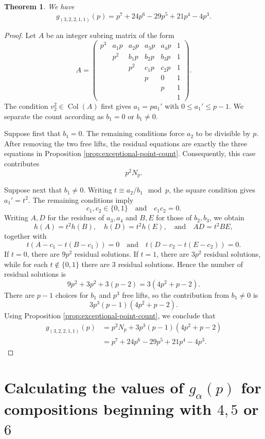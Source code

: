 \documentclass[a4paper]{amsart}
\newtheorem{theorem}{Theorem}[section]
\numberwithin{equation}{section}
\theoremstyle{remark}
\newcommand{\op}[1]{\operatorname{#1}}
\begin{document}
\begin{theorem}\label{thm:exceptional-composition}
We have
\[g_{(3,2,2,1,1)}(p)=p^7+24p^6-29p^5+21p^4-4p^3.\]
\end{theorem}
\begin{proof}
Let $A$ be an integer subring matrix of the form
\[A=\begin{pmatrix}
p^3&a_1p&a_2p&a_3p&a_4p&1\\
&p^2&b_1p&b_2p&b_3p&1\\
&&p^2&c_1p&c_2p&1\\
&&&p&0&1\\
&&&&p&1\\
&&&&&1
\end{pmatrix}.\]
The condition $v_2^2\in\op{Col}(A)$ first gives $a_1=pa_1'$ with $0\leq a_1'\leq p-1$. We separate the count according as $b_1=0$ or $b_1\neq0$.

Suppose first that $b_1=0$. The remaining conditions force $a_2$ to be divisible by $p$. After removing the two free lifts, the residual equations are exactly the three equations in Proposition \ref{prop:exceptional-point-count}. Consequently, this case contributes
\[p^2N_p.\]

Suppose next that $b_1\neq0$. Writing $t\equiv a_2/b_1\mod p$, the square condition gives $a_1'=t^2$. The remaining conditions imply
\[c_1,c_2\in\{0,1\}\quad\text{and}\quad c_1c_2=0.\]
Writing $A,D$ for the residues of $a_3,a_4$ and $B,E$ for those of $b_2,b_3$, we obtain
\[h(A)=t^2h(B),\quad h(D)=t^2h(E),\quad\text{and}\quad AD=t^2BE,\]
together with
\[t(A-c_1-t(B-c_1))=0\quad\text{and}\quad t(D-c_2-t(E-c_2))=0.\]
If $t=0$, there are $9p^2$ residual solutions. If $t=1$, there are $3p^2$ residual solutions, while for each $t\notin\{0,1\}$ there are $3$ residual solutions. Hence the number of residual solutions is
\[9p^2+3p^2+3(p-2)=3(4p^2+p-2).\]
There are $p-1$ choices for $b_1$ and $p^3$ free lifts, so the contribution from $b_1\neq0$ is
\[3p^3(p-1)(4p^2+p-2).\]
Using Proposition \ref{prop:exceptional-point-count}, we conclude that
\begin{align*}
g_{(3,2,2,1,1)}(p)
&=p^2N_p+3p^3(p-1)(4p^2+p-2)\\
&=p^7+24p^6-29p^5+21p^4-4p^3.
\end{align*}
\end{proof}

\section{Calculating the values of $g_\alpha(p)$ for compositions beginning with $4,5$ or $6$}\label{s 6}
\end{document}
